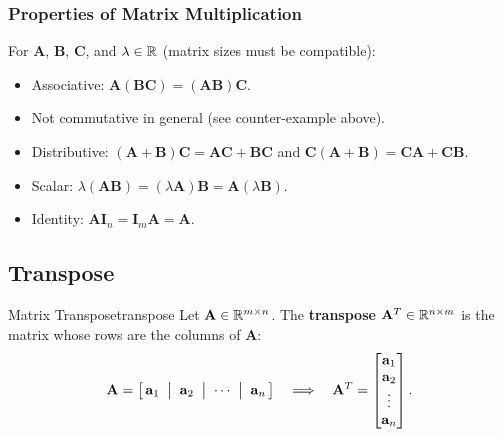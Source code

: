 \subsubsection{Properties of Matrix Multiplication}

For $\mathbf{A}$, $\mathbf{B}$, $\mathbf{C}$, and $\lambda \in \mathbb{R}$ (matrix sizes must be compatible):
\begin{itemize}
  \item Associative: $\mathbf{A}(\mathbf{B}\mathbf{C}) = (\mathbf{A}\mathbf{B})\mathbf{C}$.
  \item Not commutative in general (see counter-example above).
  \item Distributive: $(\mathbf{A} + \mathbf{B})\mathbf{C} = \mathbf{A}\mathbf{C} + \mathbf{B}\mathbf{C}$ and $\mathbf{C}(\mathbf{A} + \mathbf{B}) = \mathbf{C}\mathbf{A} + \mathbf{C}\mathbf{B}$.
  \item Scalar: $\lambda(\mathbf{A}\mathbf{B}) = (\lambda\mathbf{A})\mathbf{B} = \mathbf{A}(\lambda\mathbf{B})$.
  \item Identity: $\mathbf{A}\mathbf{I}_n = \mathbf{I}_m \mathbf{A} = \mathbf{A}$.
\end{itemize}

\subsection{Transpose}

\begin{definition}{Matrix Transpose}{transpose}
  Let $\mathbf{A} \in \mathbb{R}^{m \times n}$. The \textbf{transpose} $\mathbf{A}^T \in \mathbb{R}^{n \times m}$ is the matrix whose rows are the columns of $\mathbf{A}$:
  \[
    \mathbf{A} = \bigl[\,\mathbf{a}_1 \;\bigm|\; \mathbf{a}_2 \;\bigm|\; \cdots \;\bigm|\; \mathbf{a}_n\,\bigr]
    \quad\Longrightarrow\quad
    \mathbf{A}^T =
    \begin{bmatrix}
      \mathbf{a}_1 \\ \mathbf{a}_2 \\ \vdots \\ \mathbf{a}_n
    \end{bmatrix}
    .
  \]
\end{definition}

